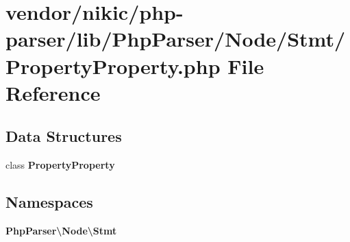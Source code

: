 \section{vendor/nikic/php-\/parser/lib/\+Php\+Parser/\+Node/\+Stmt/\+Property\+Property.php File Reference}
\label{_property_property_8php}
\subsection*{Data Structures}
\begin{DoxyCompactItemize}
\item 
class {\bf Property\+Property}
\end{DoxyCompactItemize}
\subsection*{Namespaces}
\begin{DoxyCompactItemize}
\item 
 {\bf Php\+Parser\textbackslash{}\+Node\textbackslash{}\+Stmt}
\end{DoxyCompactItemize}
